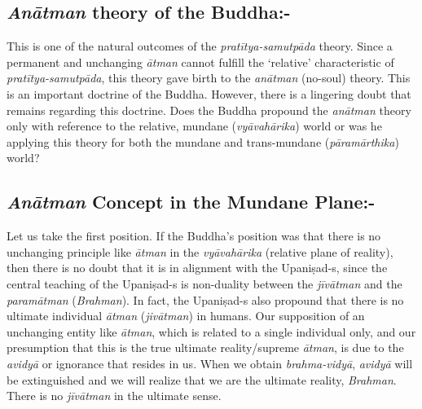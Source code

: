 \subsection*{\textit{Anātman} theory of the Buddha:-}

\vspace{-.3cm}

This is one of the natural outcomes of the \textit{pratītya-samutpāda} theory. Since a permanent and unchanging \textit{ātman} cannot fulfill the ‘relative’ characteristic of \textit{pratītya-samutpāda}, this theory gave birth to the \textit{anātman} (no-soul) theory. This is an important doctrine of the Buddha. However, there is a lingering doubt that remains regarding this doctrine. Does the Buddha propound the \textit{anātman} theory only with reference to the relative, mundane (\textit{vyāvahārika}) world or was he applying this theory for both the mundane and trans-mundane (\textit{pāramārthika}) world?

\vspace{-.3cm}

\subsection*{\textit{Anātman} Concept in the Mundane Plane:-}

Let us take the first position. If the Buddha’s position was that there is no unchanging principle like \textit{ātman} in the \textit{vyāvahārika} (relative plane of reality), then there is no doubt that it is in alignment with the Upaniṣad-s, since the central teaching of the Upaniṣad-s is non-duality between the \textit{jīvātman} and the \textit{paramātman} (\textit{Brahman}). In fact, the Upaniṣad-s also propound that there is no ultimate individual \textit{ātman} (\textit{jivātman}) in humans. Our supposition of an unchanging entity like \textit{ātman}, which is related to a single individual only, and our presumption that this is the true ultimate reality/supreme \textit{ātman}, is due to the \textit{avidyā} or ignorance that resides in us. When we obtain \textit{brahma-vidyā}, \textit{avidyā} will be extinguished and we will realize that we are the ultimate reality, \textit{Brahman}. There is no \textit{jīvātman} in the ultimate sense.

